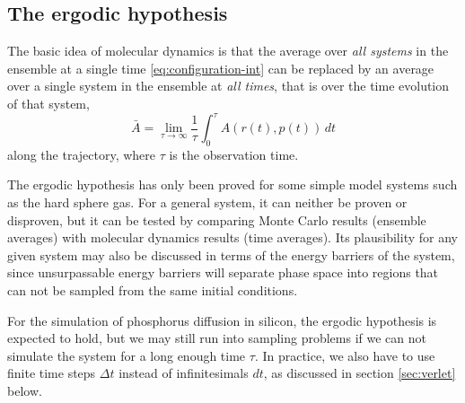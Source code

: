 \documentclass[11pt,bibliography=totoc,index=totoc]{scrbook}   %
\begin{document}

%
%


%
\subsection{The ergodic hypothesis}\label{sec:ergodic-hypothesis}
%

The basic idea of molecular dynamics is that the average over \emph{all systems} in the ensemble at a single time \eqref{eq:configuration-int} 
can be replaced by an average over a single system in the ensemble at \emph{all times}, that is over the time evolution of that system,
\begin{equation}
  \bar{A} = \lim_{\tau\to\infty} \frac{1}{\tau}\int_{0}^{\tau} A(r(t),p(t)) \,dt
  \label{eq:time-integral}
\end{equation}
along the trajectory, where $\tau$ is the observation time. 

The ergodic hypothesis has only been proved for some simple model systems such as the hard sphere gas.\cite{Ford:1973}
For a general system, it can neither be proven or disproven,\cite[99]{Tuckerman:2010}
but it can be tested by comparing Monte Carlo results (ensemble averages) with molecular dynamics results (time averages).
Its plausibility for any given system may also be discussed in terms of the energy barriers of the system,
since unsurpassable energy barriers will separate phase space into regions that can not be sampled from the same initial conditions.

For the simulation of phosphorus diffusion in silicon, the ergodic hypothesis is expected to hold,
but we may still run into sampling problems if we can not simulate the system for a long enough time $\tau$.
In practice, we also have to use finite time steps $\Delta t$ instead of infinitesimals $dt$, as discussed in section \ref{sec:verlet} below.
\end{document}
